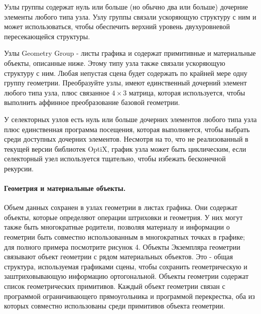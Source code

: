 Узлы группы содержат нуль или больше (но обычно два или больше) дочерние элементы любого типа узла. Узлу группы связали ускоряющую структуру с ним и может использоваться, чтобы обеспечить верхний уровень двухуровневой пересекающейся структуры.

Узлы Geometry Group - листы графика и содержат примитивные и материальные объекты, описанные ниже. Этому типу узла также связали ускоряющую структуру с ним. Любая непустая сцена будет содержать по крайней мере одну группу геометрии.
Преобразуйте узлы, имеют единственный дочерний элемент любого типа узла, плюс связанное $4\times3$ матрица, которая используется, чтобы выполнить аффинное преобразование базовой геометрии.

У селекторных узлов есть нуль или больше дочерних элементов любого типа узла плюс единственная программа посещения, которая выполняется, чтобы выбрать среди доступных дочерних элементов. Несмотря на то, что не реализованный в текущей версии библиотек OptiX, график узла может быть циклическим, если селекторный узел используется тщательно, чтобы избежать бесконечной рекурсии.
\paragraph{ Геометрия и материальные объекты.}

Объем данных сохранен в узлах геометрии в листах графика. Они содержат объекты, которые определяют операции штриховки и геометрия. У них могут также быть многократные родители, позволяя материалу и информации о геометрии быть совместно использованным в многократных точках в графике; для полного примера посмотрите рисунок 4. Объекты Экземпляра геометрии связывают объект геометрии с рядом материальных объектов. Это - общая структура, используемая графиками сцены, чтобы сохранить геометрическую и заштриховывающую информацию ортогональной. Объекты геометрии содержат список геометрических примитивов. Каждый объект геометрии связан с программой ограничивающего прямоугольника и программой перекрестка, оба из которых совместно использованы среди примитивов объекта геометрии.

